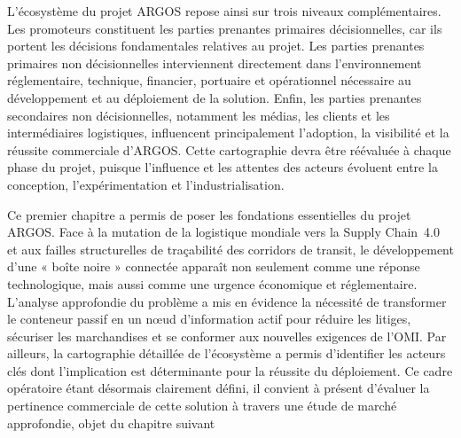 L’écosystème du projet ARGOS repose ainsi sur trois niveaux complémentaires. Les promoteurs constituent les parties prenantes primaires décisionnelles, car ils portent les décisions fondamentales relatives au projet. Les parties prenantes primaires non décisionnelles interviennent directement dans l’environnement réglementaire, technique, financier, portuaire et opérationnel nécessaire au développement et au déploiement de la solution. Enfin, les parties prenantes secondaires non décisionnelles, notamment les médias, les clients et les intermédiaires logistiques, influencent principalement l’adoption, la visibilité et la réussite commerciale d’ARGOS. Cette cartographie devra être réévaluée à chaque phase du projet, puisque l’influence et les attentes des acteurs évoluent entre la conception, l’expérimentation et l’industrialisation\cite{iso21502}.

\par Ce premier chapitre a permis de poser les fondations essentielles du projet ARGOS. Face à la mutation de la logistique mondiale vers la Supply Chain~4.0 et aux failles structurelles de traçabilité des corridors de transit, le développement d'une « boîte noire » connectée apparaît non seulement comme une réponse technologique, mais aussi comme une urgence économique et réglementaire. L'analyse approfondie du problème a mis en évidence la nécessité de transformer le conteneur passif en un nœud d'information actif pour réduire les litiges, sécuriser les marchandises et se conformer aux nouvelles exigences de l'OMI. Par ailleurs, la cartographie détaillée de l'écosystème a permis d'identifier les acteurs clés dont l'implication est déterminante pour la réussite du déploiement. Ce cadre opératoire étant désormais clairement défini, il convient à présent d'évaluer la pertinence commerciale de cette solution à travers une étude de marché approfondie, objet du chapitre suivant
